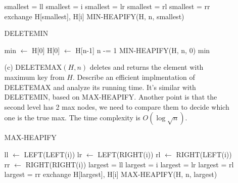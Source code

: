 \documentclass{article}       %
\begin{document}
\begin{enumerate}
\begin{enumerate}
\begin{algorithm}[H]
\begin{algorithmic}[1]
				\State smallest = ll
				\Else \State smallest = i
				\EndIf
				\State smallest = lr
				\EndIf
				\State smallest = rl
				\EndIf
				\State smallest = rr
				\EndIf
				\State exchange H[smallest], H[i]
				\State MIN-HEAPIFY(H, n, smallest)
				\EndIf				
				\EndProcedure
			\end{algorithmic}\label{p1}
		\end{algorithm}	
		\begin{algorithm}[H]
			\caption{DELETEMIN}
			\small
			\begin{algorithmic}[1]
				\State min $\gets$ H[0]	
				\State H[0] $\gets$ H[n-1]
				\State n -= 1
				\State MIN-HEAPIFY(H, n, 0)	
				\State \Return min	
				\EndProcedure
			\end{algorithmic}\label{p1}
		\end{algorithm}	
		\item[(c)] DELETEMAX$(H,n)$ deletes and returns the element with maximum key from $H$. Describe an efficient implmentation of DELETEMAX and analyze its running time.\newline\newline
		It's similar with DELETEMIN, based on MAX-HEAPIFY. Another point is that the second level has 2 max nodes, we need to compare them to decide which one is the true max. The time complexity is $O(\log \sqrt{n})$.
		\begin{algorithm}[H]
			\caption{MAX-HEAPIFY}
			\small
			\begin{algorithmic}[1]
				\State ll $\gets$ LEFT(LEFT(i))
				\State lr $\gets$ LEFT(RIGHT(i))
				\State rl $\gets$ RIGHT(LEFT(i))
				\State rr $\gets$ RIGHT(RIGHT(i))
				\State largest = ll
				\Else \State largest = i
				\EndIf
				\State largest = lr
				\EndIf
				\State largest = rl
				\EndIf
				\State largest = rr
				\EndIf
				\State exchange H[largest], H[i]
				\State MAX-HEAPIFY(H, n, largest)
				\EndIf				
				\EndProcedure
			\end{algorithmic}\label{p1}
		\end{algorithm}	
		\begin{algorithm}[H]

\end{algorithm}
\end{enumerate}
\end{enumerate}
\end{document}
